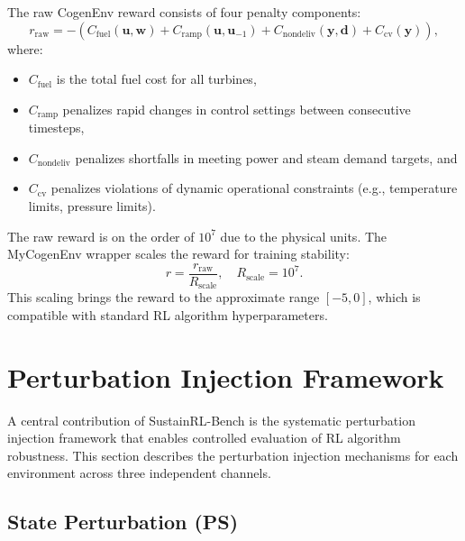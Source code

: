 The raw CogenEnv reward consists of four penalty components:
\begin{equation}
    r_{\text{raw}} = -\left(C_{\text{fuel}}(\mathbf{u}, \mathbf{w}) + C_{\text{ramp}}(\mathbf{u}, \mathbf{u}_{-1}) + C_{\text{nondeliv}}(\mathbf{y}, \mathbf{d}) + C_{\text{cv}}(\mathbf{y})\right),
    \label{eq:cogen_reward_raw}
\end{equation}
where:
\begin{itemize}
    \item $C_{\text{fuel}}$ is the total fuel cost for all turbines,
    \item $C_{\text{ramp}}$ penalizes rapid changes in control settings between consecutive timesteps,
    \item $C_{\text{nondeliv}}$ penalizes shortfalls in meeting power and steam demand targets, and
    \item $C_{\text{cv}}$ penalizes violations of dynamic operational constraints (e.g., temperature limits, pressure limits).
\end{itemize}

The raw reward is on the order of $10^7$ due to the physical units. The MyCogenEnv wrapper scales the reward for training stability:
\begin{equation}
    r = \frac{r_{\text{raw}}}{R_{\text{scale}}}, \quad R_{\text{scale}} = 10^7.
    \label{eq:cogen_reward}
\end{equation}
This scaling brings the reward to the approximate range $[-5, 0]$, which is compatible with standard RL algorithm hyperparameters.

\section{Perturbation Injection Framework}
\label{sec:noise_framework}

A central contribution of SustainRL-Bench is the systematic perturbation injection framework that enables controlled evaluation of RL algorithm robustness. This section describes the perturbation injection mechanisms for each environment across three independent channels.

\subsection{State Perturbation (PS)}
\label{sec:obs_noise}

